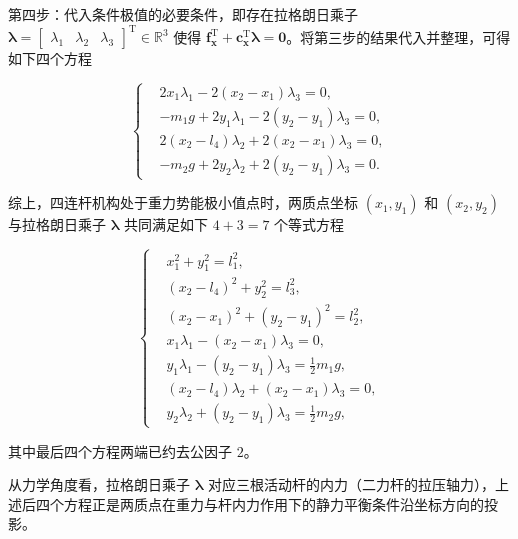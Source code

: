 \begin{solution}
第四步：代入条件极值的必要条件，即存在拉格朗日乘子 $\boldsymbol{\lambda}=\begin{bmatrix}\lambda_1&\lambda_2&\lambda_3\end{bmatrix}^{\mathrm{T}}\in\mathbb{R}^3$ 使得 $\boldsymbol{f}_{\boldsymbol{x}}^{\mathrm{T}}+\boldsymbol{c}_{\boldsymbol{x}}^{\mathrm{T}}\boldsymbol{\lambda}=\boldsymbol{0}$。将第三步的结果代入并整理，可得如下四个方程

\[
\left\{
\begin{aligned}
&2x_1\lambda_1-2(x_2-x_1)\lambda_3=0,\\
&-m_1g+2y_1\lambda_1-2(y_2-y_1)\lambda_3=0,\\
&2(x_2-l_4)\lambda_2+2(x_2-x_1)\lambda_3=0,\\
&-m_2g+2y_2\lambda_2+2(y_2-y_1)\lambda_3=0.
\end{aligned}
\right.
\]

综上，四连杆机构处于重力势能极小值点时，两质点坐标 $(x_1,y_1)$ 和 $(x_2,y_2)$ 与拉格朗日乘子 $\boldsymbol{\lambda}$ 共同满足如下 $4+3=7$ 个等式方程

\[
\left\{
\begin{aligned}
&x_1^2+y_1^2=l_1^2,\\
&(x_2-l_4)^2+y_2^2=l_3^2,\\
&(x_2-x_1)^2+(y_2-y_1)^2=l_2^2,\\
&x_1\lambda_1-(x_2-x_1)\lambda_3=0,\\
&y_1\lambda_1-(y_2-y_1)\lambda_3=\tfrac{1}{2}m_1g,\\
&(x_2-l_4)\lambda_2+(x_2-x_1)\lambda_3=0,\\
&y_2\lambda_2+(y_2-y_1)\lambda_3=\tfrac{1}{2}m_2g,
\end{aligned}
\right.
\]

其中最后四个方程两端已约去公因子 $2$。

从力学角度看，拉格朗日乘子 $\boldsymbol{\lambda}$ 对应三根活动杆的内力（二力杆的拉压轴力），上述后四个方程正是两质点在重力与杆内力作用下的静力平衡条件沿坐标方向的投影。
\end{solution}
